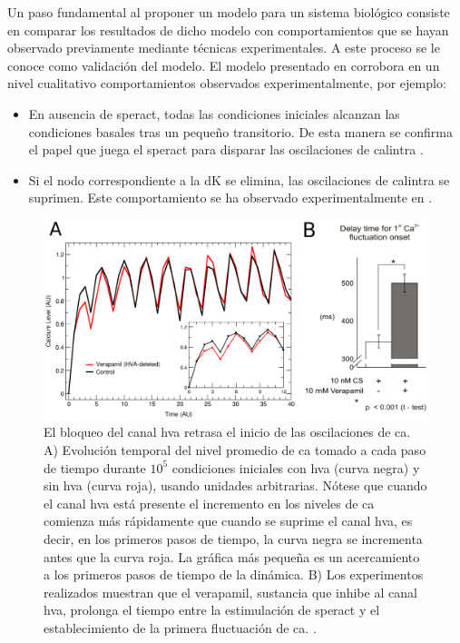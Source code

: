 Un paso fundamental al proponer un modelo para un sistema biológico consiste en comparar los resultados de dicho modelo con comportamientos que se hayan observado previamente mediante técnicas experimentales. A este proceso se le conoce como validación del modelo. El modelo presentado en \citeauthor{Espinal2011} \citep{Espinal2011} corrobora en un nivel cualitativo comportamientos observados experimentalmente, por ejemplo:
\begin{itemize}
\item En ausencia de speract, todas las condiciones iniciales alcanzan las condiciones basales tras un pequeño transitorio. De esta manera se confirma el papel que juega el speract para disparar las oscilaciones de \ac{calintra} \citeauthor{Espinal2011} \citep{Espinal2011}.
\item Si el nodo correspondiente a la \ac{dK} se elimina, las oscilaciones de \ac{calintra} se suprimen. Este comportamiento se ha observado experimentalmente en \citeauthor{Babcock:1992uf} \citep{Babcock:1992uf}.
\end{itemize}

\begin{figure}[hbt]
\includegraphics[width=0.9\linewidth]{gfx/figura8Chucho}
\caption[El bloqueo del canal \ac{hva} retrasa el inicio de las oscilaciones de \ac{ca}]{El bloqueo del canal \ac{hva} retrasa el inicio de las oscilaciones de \ac{ca}. A) Evolución temporal del nivel promedio de \ac{ca} tomado a cada paso de tiempo durante $10^5$ condiciones iniciales con \ac{hva} (curva negra) y sin \ac{hva} (curva roja), usando unidades arbitrarias. Nótese que cuando el canal \ac{hva} está presente el incremento en los niveles de \ac{ca} comienza más rápidamente que cuando se suprime el canal \ac{hva}, es decir, en los primeros pasos de tiempo, la curva negra se incrementa antes que la curva roja. La gráfica más pequeña es un acercamiento a los primeros pasos de tiempo de la dinámica. B) Los experimentos realizados muestran que el verapamil, sustancia que inhibe al canal \ac{hva}, prolonga el tiempo entre la estimulación de speract y el establecimiento de la primera fluctuación de \ac{ca}. \citeauthor{Espinal2011} \citep{Espinal2011}.}\label{fig:verapamil}
\end{figure}

